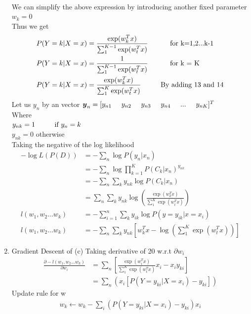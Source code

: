 \documentclass[12pt]{article}
\begin{document}
\begin{enumerate}[label=\alph*.]
\begin{align}
\end{align}
We can simplify the above expression by introducing another fixed parameter $w_k = 0$\\
Thus we get\\
\begin{align}
P(Y=k|X=x) &= \frac{\exp (w_k^T x)}{\sum_1^{K-1}\exp (w_t^T x)} \hspace{10mm} \textrm{ for k=1,2...k-1}\\
P(Y=k|X=x) &= \frac{1}{\sum_1^{K-1}\exp (w_t^T x)} \hspace{10mm} \textrm{ for k = K}\\
P(Y=k|X=x) &= \frac{\exp (w_k^T x)}{\sum_1^{K}\exp (w_t^T x) } \hspace{10mm} \textrm{By adding 13 and 14}
\end{align}
Let us $y_n$ by an vector $\boldsymbol y_{n} = [y_{n1} \hspace{5mm} y_{n2} \hspace{5mm} y_{n3} \hspace{5mm} y_{n4} \hspace{5mm} ... \hspace{5mm} y_{nK}]^T$\\
Where \\$y_{nk} = 1 \hspace{10mm} \textrm{if $y_n = k$}$\\
$y_{nk} = 0$ \hspace{8mm} otherwise\\
Taking the negative of the log likelihood
\begin{align}
- \log L(P(D)) &= -\sum_n  \log P(y_n|x_n)\\
&= -\sum_n \log \prod_{k=1}^K P(C_k|x_n)^{y_{nk}}\\
&= -\sum_n \sum_k y_{nk} \log P(C_k|x_n)\\
&= \sum_n \sum_k y_{nk} \log (\frac{\exp (w_k^T x)}{\sum_1^{K}\exp (w_t^T x) })\\
l(w_1,w_2...w_k)&= -\sum_{i=1}^n \sum_k y_{ik} \log P(y= y_{ik}|x = x_i)\\
l(w_1,w_2...w_k)&= - \sum_n \sum_k y_{nk}[ w_k^T x - \log (\sum_1^{K}\exp (w_t^T x)) ]
\end{align}
\item Gradient Descent of (c)
Taking derivative of 20 w.r.t $\partial w_i$\\
\begin{align}
\frac{\partial - l(w_1,w_2...w_k)} {\partial w_i} &=  \sum_n[\frac{\exp (w_i^T x)}{\sum_1^{K}\exp (w_t^T x)}x_i - x_i y_{ki}]\\
& = \sum_n (x_i[P(Y=y_{ki}|X=x_i) - y_{ki}])
\end{align}
Update rule for w
\begin{align}
w_k \leftarrow w_k - \sum_i(P(Y=y_{ki}|X=x_i) - y_{ki})x_i
\end{align}
\end{enumerate}
\end{document}
